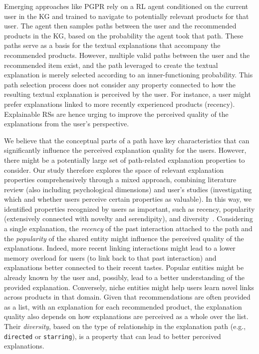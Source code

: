 \documentclass[sigconf]{acmart}
\begin{document}
Emerging approaches like PGPR rely on a RL agent conditioned on the current user in the KG and trained to navigate to potentially relevant products for that user. 
The agent then samples paths between the user and the recommended products in the KG, based on the probability the agent took that path. 
These paths serve as a basis for the textual explanations that accompany the recommended products. 
However, multiple valid paths between the user and the recommended item exist, and the path leveraged to create the textual explanation is merely selected according to an inner-functioning probability. 
This path selection process does not consider any property connected to how the resulting textual explanation is perceived by the user.  
For instance, a user might prefer explanations linked to more recently experienced products (recency).  
Explainable RSs are hence urging to improve the perceived quality of the explanations from the user's perspective. 

\vspace{1mm}  
We believe that the conceptual parts of a path have key characteristics that can significantly influence the perceived explanation quality for the users.
However, there might be a potentially large set of path-related explanation properties to consider. 
Our study therefore explores the space of relevant explanation properties comprehensively through a mixed approach, combining literature review (also including psychological dimensions) and user's studies (investigating which and whether users perceive certain properties as valuable). 
In this way, we identified properties recognized by users as important, such as recency, popularity (extensively connected with novelty and serendipity), and diversity~\cite{DBLP:journals/tiis/KaminskasB17}.     
Considering a single explanation, the \emph{recency} of the past interaction attached to the path  and the \emph{popularity} of the shared entity might influence the perceived quality of the explanations. 
Indeed, more recent linking interactions might lead to a lower memory overload for users (to link back to that past interaction) and explanations better connected to their recent tastes. 
Popular entities might be already known by the user and, possibly, lead to a better understanding of the provided explanation. Conversely, niche entities might help users learn novel links across products in that domain. 
Given that recommendations are often provided as a list, with an explanation for each recommended product, the explanation quality also depends on how explanations are perceived as a whole over the list.  
Their \emph{diversity}, based on the type of relationship in the explanation path (e.g., \texttt{directed} or \texttt{starring}), is a property that can lead to better perceived explanations.
\end{document}
